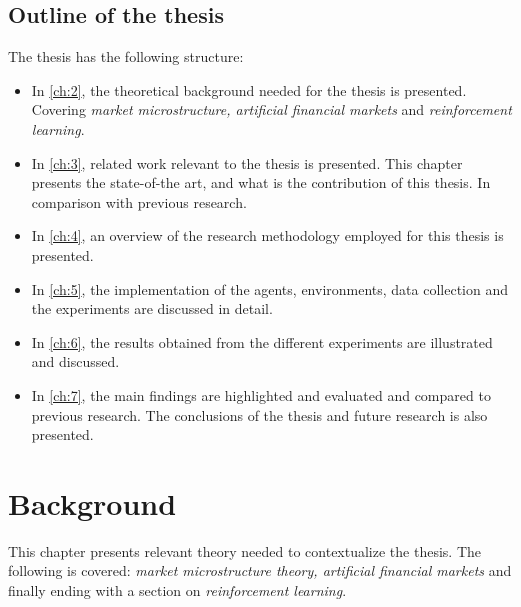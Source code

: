\documentclass{kththesis}
\theoremstyle{definition}
\begin{document}
\newpage
\section{Outline of the thesis}
The thesis has the following structure:

\begin{itemize}
    \item In \autoref{ch:2}, the theoretical background needed for the thesis is presented. Covering \textit{market microstructure, artificial financial markets} and \textit{reinforcement learning}.
    
    \item In \autoref{ch:3}, related work relevant to the thesis is presented. This chapter presents the state-of-the art, and what is the contribution of this thesis. In comparison with previous research.
    
    \item In \autoref{ch:4}, an overview of the research methodology employed for this thesis is presented.
    
    \item In \autoref{ch:5}, the implementation of the agents, environments, data collection and the experiments are discussed in detail.
    
    \item In \autoref{ch:6}, the results obtained from the different experiments are illustrated and discussed.
    
    \item In \autoref{ch:7}, the main findings are highlighted and evaluated and compared to previous research. The conclusions of the thesis and future research is also presented.
\end{itemize}

\chapter{Background}\label{ch:2}
This chapter presents relevant theory needed to contextualize the thesis. The following is covered: \textit{market microstructure theory, artificial financial markets} and finally ending with a section on \textit{reinforcement learning}.

\end{document}
